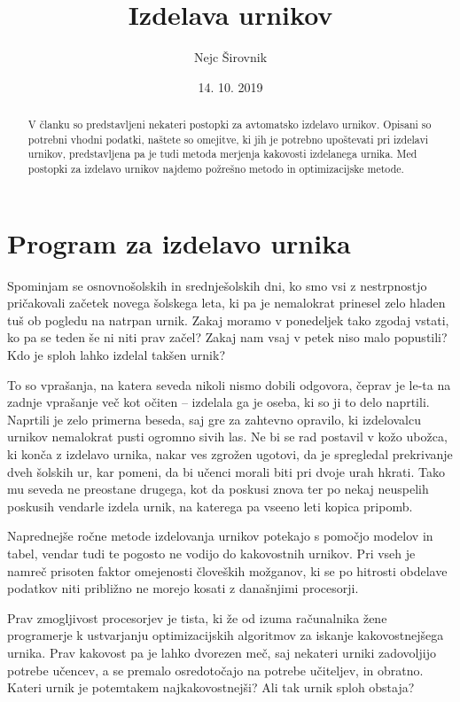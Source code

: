\documentclass[a4paper,10pt]{article}
\begin{document}
\title{Izdelava urnikov}
\author{Nejc Širovnik}
\date{14. 10. 2019}
\maketitle

\begin{abstract}
V članku so predstavljeni nekateri postopki za avtomatsko izdelavo urnikov. Opisani so potrebni vhodni podatki, naštete so omejitve, ki jih je potrebno upoštevati pri izdelavi urnikov, predstavljena pa je tudi metoda merjenja kakovosti izdelanega urnika. Med postopki za izdelavo urnikov najdemo požrešno metodo in optimizacijske metode.
\end{abstract}

\section{Program za izdelavo urnika}
Spominjam se osnovnošolskih in srednješolskih dni, ko smo vsi z nestrpnostjo pričakovali začetek novega šolskega leta, ki pa je nemalokrat prinesel zelo hladen tuš ob pogledu na natrpan urnik. Zakaj moramo v ponedeljek tako zgodaj vstati, ko pa se teden še ni niti prav začel? Zakaj nam vsaj v petek niso malo popustili? Kdo je sploh lahko izdelal takšen urnik?

To so vprašanja, na katera seveda nikoli nismo dobili odgovora, čeprav je le-ta na zadnje vprašanje več kot očiten – izdelala ga je oseba, ki so ji to delo naprtili. Naprtili je zelo primerna beseda, saj gre za zahtevno opravilo, ki izdelovalcu urnikov nemalokrat pusti ogromno sivih las. Ne bi se rad postavil v kožo ubožca, ki konča z izdelavo urnika, nakar ves zgrožen ugotovi, da je spregledal prekrivanje dveh šolskih ur, kar pomeni, da bi učenci morali biti pri dvoje urah hkrati. Tako mu seveda ne preostane drugega, kot da poskusi znova ter po nekaj neuspelih poskusih vendarle izdela urnik, na katerega pa vseeno leti kopica pripomb.

Naprednejše ročne metode izdelovanja urnikov potekajo s pomočjo modelov in tabel, vendar tudi te pogosto ne vodijo do kakovostnih urnikov. Pri vseh je namreč prisoten faktor omejenosti človeških možganov, ki se po hitrosti obdelave podatkov niti približno ne morejo kosati z današnjimi procesorji.

Prav zmogljivost procesorjev je tista, ki že od izuma računalnika žene programerje k ustvarjanju optimizacijskih algoritmov za iskanje kakovostnejšega urnika. Prav kakovost pa je lahko dvorezen meč, saj nekateri urniki zadovoljijo potrebe učencev, a se premalo osredotočajo na potrebe učiteljev, in obratno. Kateri urnik je potemtakem najkakovostnejši? Ali tak urnik sploh obstaja?
\end{document}

